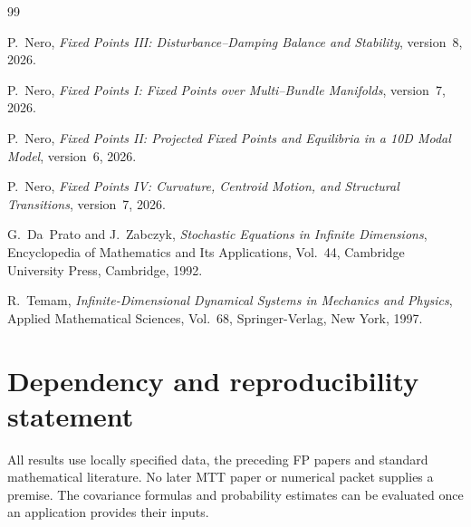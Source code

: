 \documentclass[11pt]{article}
\begin{document}
\begin{thebibliography}{99}

P.~Nero,
\newblock \emph{Fixed Points III: Disturbance--Damping Balance and
Stability},
\newblock version~8, 2026.

P.~Nero, \emph{Fixed Points I: Fixed Points over Multi--Bundle Manifolds},
version~7, 2026.

P.~Nero, \emph{Fixed Points II: Projected Fixed Points and Equilibria in a
10D Modal Model}, version~6, 2026.

P.~Nero, \emph{Fixed Points IV: Curvature, Centroid Motion, and Structural
Transitions}, version~7, 2026.

G.~Da~Prato and J.~Zabczyk,
\newblock \emph{Stochastic Equations in Infinite Dimensions},
\newblock Encyclopedia of Mathematics and Its Applications, Vol.~44,
\newblock Cambridge University Press, Cambridge, 1992.

R.~Temam,
\newblock \emph{Infinite-Dimensional Dynamical Systems in Mechanics and Physics},
\newblock Applied Mathematical Sciences, Vol.~68,
\newblock Springer-Verlag, New York, 1997.

\end{thebibliography}


\section*{Dependency and reproducibility statement}
All results use locally specified data, the preceding FP papers and standard
mathematical literature. No later MTT paper or numerical packet supplies a
premise. The covariance formulas and probability estimates can be evaluated
once an application provides their inputs.
\end{document}

